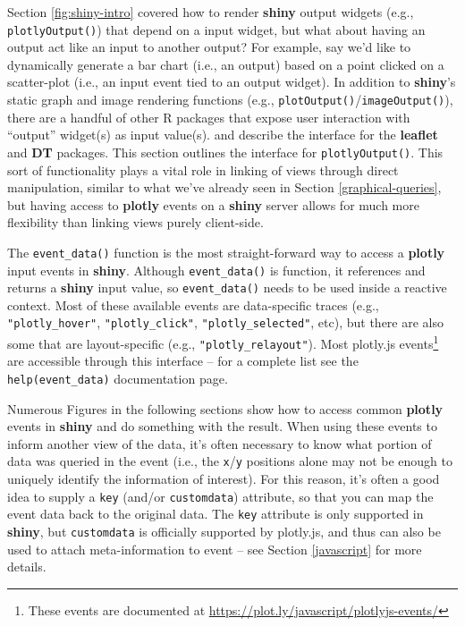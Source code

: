 \documentclass[
  12pt,
]{krantz}
\begin{document}
Section \ref{fig:shiny-intro} covered how to render \textbf{shiny} output widgets (e.g., \texttt{plotlyOutput()}) that depend on a input widget, but what about having an output act like an input to another output? For example, say we'd like to dynamically generate a bar chart (i.e., an output) based on a point clicked on a scatter-plot (i.e., an input event tied to an output widget). In addition to \textbf{shiny}'s static graph and image rendering functions (e.g., \texttt{plotOutput()}/\texttt{imageOutput()}), there are a handful of other R packages that expose user interaction with ``output'' widget(s) as input value(s). \citet{leaflet-shiny} and \citet{DT-shiny} describe the interface for the \textbf{leaflet} and \textbf{DT} packages. This section outlines the interface for \texttt{plotlyOutput()}. This sort of functionality plays a vital role in linking of views through direct manipulation, similar to what we've already seen in Section \ref{graphical-queries}, but having access to \textbf{plotly} events on a \textbf{shiny} server allows for much more flexibility than linking views purely client-side.

The \texttt{event\_data()} function is the most straight-forward way to access a \textbf{plotly} input events in \textbf{shiny}. Although \texttt{event\_data()} is function, it references and returns a \textbf{shiny} input value, so \texttt{event\_data()} needs to be used inside a reactive context. Most of these available events are data-specific traces (e.g., \texttt{"plotly\_hover"}, \texttt{"plotly\_click"}, \texttt{"plotly\_selected"}, etc), but there are also some that are layout-specific (e.g., \texttt{"plotly\_relayout"}). Most plotly.js events\footnote{These events are documented at \url{https://plot.ly/javascript/plotlyjs-events/}} are accessible through this interface -- for a complete list see the \texttt{help(event\_data)} documentation page.

Numerous Figures in the following sections show how to access common \textbf{plotly} events in \textbf{shiny} and do something with the result. When using these events to inform another view of the data, it's often necessary to know what portion of data was queried in the event (i.e., the \texttt{x}/\texttt{y} positions alone may not be enough to uniquely identify the information of interest). For this reason, it's often a good idea to supply a \texttt{key} (and/or \texttt{customdata}) attribute, so that you can map the event data back to the original data. The \texttt{key} attribute is only supported in \textbf{shiny}, but \texttt{customdata} is officially supported by plotly.js, and thus can also be used to attach meta-information to event -- see Section \ref{javascript} for more details.
\end{document}
